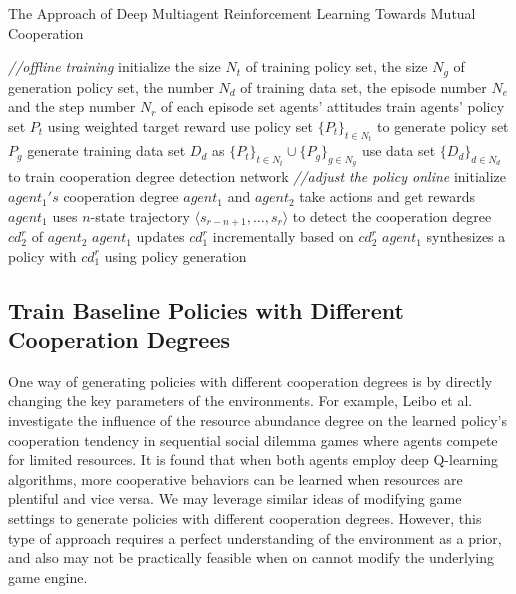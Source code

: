 \documentclass{article}
\begin{document}
\begin{algorithm}[tp]
\caption{The Approach of Deep Multiagent Reinforcement Learning Towards Mutual Cooperation}
\begin{algorithmic}[1]
\STATE \emph{//offline training}
\STATE initialize the size $N_{t}$ of training policy set, the size $N_{g}$ of generation policy set, the number $N_{d}$ of training data set,
	 the episode number $N_e$ and the step number $N_r$ of each episode
 \label{alline3}
\STATE set agents' attitudes
\STATE train agents' policy set $P_{t}$ using weighted target reward\label{alline5}
\ENDFOR
{} \label{alline6}
\STATE use policy set $\{P_{t}\}_{t \in N_t}$ to generate policy set $P_{g}$ \label{alline7}
\ENDFOR
{} \label{alline8}
\STATE generate training data set $D_{d}$ as $\{P_{t}\}_{t \in N_t} \cup \{P_{g}\}_{g \in N_g}$
\ENDFOR
\STATE use data set $\{D_{d}\}_{d \in N_d}$ to train cooperation degree detection network \label{alline10}
\STATE \emph{//adjust the policy online}
\STATE initialize $agent_1's$ cooperation degree \label{alline11}
 \label{alline13}
\STATE $agent_1$ and $agent_2$ take actions and get rewards
\STATE $agent_1$ uses $n$-state trajectory $\langle s_{r-n+1}, \ldots, s_r \rangle$ to detect the cooperation degree $cd_2^r$ of $agent_2$
\STATE $agent_1$ updates $cd_1^r$ incrementally based on $cd_2^r$
\STATE $agent_1$ synthesizes a policy with $cd_1^r$ using policy generation \label{alline18}
\ENDFOR
\ENDFOR
\end{algorithmic}
\end{algorithm}

\subsection{Train Baseline Policies with Different Cooperation Degrees}

One way of generating policies with different cooperation degrees is by directly changing the key parameters of the environments. For example, Leibo et al.~\cite{leibo2017multi} investigate the influence of the resource abundance degree on the learned policy's cooperation tendency in sequential social dilemma games where agents compete for limited resources. It is found that when both agents employ deep Q-learning algorithms, more cooperative behaviors can be learned when resources are plentiful and vice versa. We may leverage similar ideas of modifying game settings to generate policies with different cooperation degrees. However, this type of approach requires a perfect understanding of the environment as a prior, and also may not be practically feasible when on cannot modify the underlying game engine.
\end{document}
